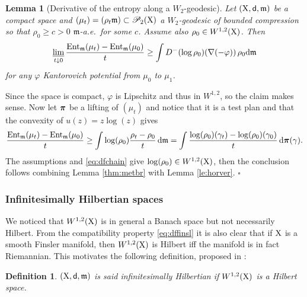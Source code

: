 \documentclass[11pt]{article}
\numberwithin{equation}{section}
\newtheorem{lemma}[theorem]{Lemma}
\newtheorem{definition}[theorem]{Definition}
\newenvironment{idea}{\removelastskip\par\medskip   %
\noindent{\em Idea of the proof} \rm}{\penalty-20\null\hfill$\square$\par\medbreak}
\newcommand{\ppi}{{\mbox{\boldmath$\pi$}}}
\newcommand{\prd}{\mathscr P_2}
\newcommand{\X}{{\rm X}}
\newcommand{\sfd}{{\sf d}}
\newcommand{\mm}{{\mathfrak m}}
\newcommand{\ent}{{\rm Ent}_\mm}
\renewcommand{\d}{{\rm d}}
\newcommand{\limi}{\varliminf}
\begin{document}
\begin{lemma}[Derivative of the entropy along a $W_2$-geodesic]\label{le:derent}
Let $(\X,\sfd,\mm)$ be a compact space and $(\mu_t)=(\rho_t\mm)\subset \prd(\X)$ a $W_2$-geodesic of bounded compression so that   $\rho_0\geq c>0$ $\mm$-a.e.\ for some $c$. Assume also $\rho_0\in W^{1,2}(\X)$. Then
\begin{equation}
\label{eq:derent}
\limi_{t\downarrow0}\frac{\ent(\mu_t)-\ent(\mu_0)}{t}\geq \int D^-(\log\rho_0)(\nabla(-\varphi))\,\rho_0\d\mm
\end{equation}
for any $\varphi$ Kantorovich potential from $\mu_0$ to $\mu_1$.
\end{lemma}
\begin{idea} Since the space is compact, $\varphi$ is Lipschitz and thus in $W^{1,2}$, so the claim makes sense. Now let $\ppi$ be a lifting of $(\mu_t)$ and notice that it is a test plan and that the convexity of $u(z)=z\log(z)$ gives
\[
\frac{\ent(\mu_t)-\ent(\mu_0)}{t}\geq \int \log(\rho_0)\frac{\rho_t-\rho_0}{t}\,\d\mm=\int\frac{\log(\rho_0)(\gamma_t)-\log(\rho_0)(\gamma_0)}t\,\d\ppi(\gamma).
\]
The assumptions and \eqref{eq:dfchain} give $\log(\rho_0)\in W^{1,2}(\X)$, then the  conclusion follows combining  Lemma \ref{thm:metbr} with Lemma \ref{le:horver}.
\end{idea}


\subsubsection{Infinitesimally Hilbertian spaces}
We noticed that $W^{1,2}(\X)$ is in general a Banach space but not necessarily Hilbert. From the compatibility property \eqref{eq:dffinsl} it is also clear that if $\X$ is a smooth Finsler manifold, then $W^{1,2}(\X)$ is Hilbert iff the manifold is in fact Riemannian. This motivates the following definition, proposed in \cite{Gigli12}:
\begin{definition}\label{def:infhilb}  $(\X,\sfd,\mm)$ is said infinitesimally Hilbertian if $W^{1,2}(\X)$ is a Hilbert space.
\end{definition}
\end{document}
